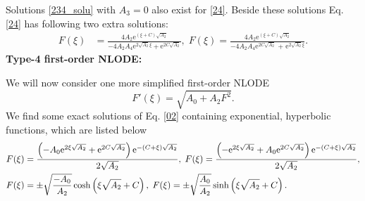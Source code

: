 \documentclass[prd,aps,floats,showkeys,nofootinbib,notitlepage]{revtex4}
\begin{document}
	Solutions \eqref{234_solu} with $A_3=0$ also exist for \eqref{24}. Beside these solutions Eq. \eqref{24} has following two extra solutions:
	\begin{subequations}\label{24_solu}
		\begin{align}
			F(\xi) &=   \frac{{4{A_2} {{\text{e}}^{\left( {\xi  + C} \right)\sqrt {{A_2}} }}}}{{ - 4 {A_2} {A_4} {{\text{e}}^{2 \sqrt {{A_2}} \xi }} + {{\text{e}}^{2 C \sqrt {{A_2}} }}}}, \;
			F(\xi) =   \frac{{4{A_2} {{\text{e}}^{\left( {\xi  + C} \right)\sqrt {{A_2}} }}}}{{ - 4 {A_2} {A_4} {{\text{e}}^{2 C \sqrt {{A_2}} }}{\text{ + }}{{\text{e}}^{2 \sqrt {{A_2}} \xi }}}}.
		\end{align}
	\end{subequations}
	\textbf{Type-4 first-order NLODE:}
	\par We will now consider one more simplified first-order NLODE
	\begin{equation}\label{02}
		F'(\xi ) = \sqrt{{A_0} + {A_2}{F^2}}.
	\end{equation}
	We find some exact solutions of Eq. \eqref{02} containing exponential, hyperbolic functions, which are listed below
	\begin{subequations}\label{02_solu}
		\begin{align}
			F(\xi) &=  \frac{{\left( { - {A_0} {{\text{e}}^{2 \xi \sqrt {{A_2}} }} + {{\text{e}}^{2 C\sqrt {{A_2}} }}} \right){{\text{e}}^{ - \left( {C + \xi } \right)\sqrt {{A_2}} }}}}{{2\sqrt {{A_2}} }}, \;
			F(\xi) =  \frac{{\left( { -  {{\text{e}}^{2 \xi \sqrt {{A_2}} }} + {A_0}{{\text{e}}^{2 C\sqrt {{A_2}} }}} \right){{\text{e}}^{ - \left( {C + \xi } \right)\sqrt {{A_2}} }}}}{{2\sqrt {{A_2}} }}, \hfill \\
			F(\xi) &=   \pm \sqrt {\frac{{ - {A_0}}}{{{A_2}}}} \cosh \left( {\xi \sqrt {{A_2}}  + C} \right), \;
			F(\xi) =   \pm \sqrt {\frac{{{A_0}}}{{{A_2}}}} \sinh \left( {\xi \sqrt {{A_2}}  + C} \right). 
		\end{align}
	\end{subequations}
	
	
	
\end{document}
